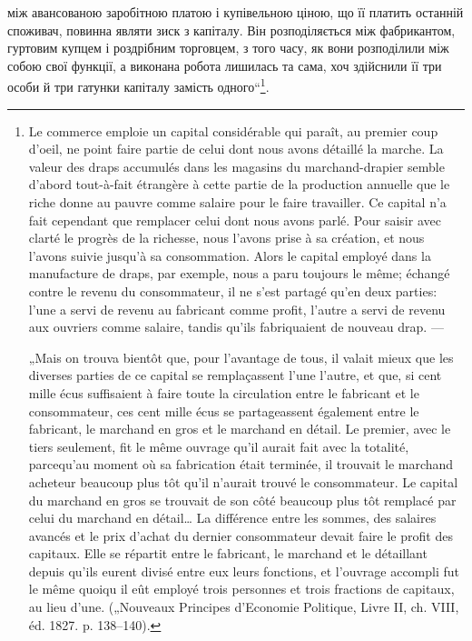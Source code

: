 \parcont{}  %
між авансованою заробітною платою і купівельною ціною, що її платить
останній споживач, повинна являти зиск з капіталу. Він розподіляється
між фабрикантом, гуртовим купцем і роздрібним торговцем, з того часу,
як вони розподілили між собою свої функції, а виконана робота лишилась
та сама, хоч здійснили її три особи й три гатунки капіталу
замість одного“\footnote*{
Le commerce emploie un capital considérable qui paraît, au premier coup
d’oeil, ne point faire partie de celui dont nous avons détaillé la marche. La valeur
des draps accumulés dans les magasins du marchand-drapier semble d'abord tout-à-fait étrangère à
cette partie de la production annuelle que le riche donne au
pauvre comme salaire pour le faire travailler. Ce capital n’a fait cependant que
remplacer celui dont nous avons parlé. Pour saisir avec clarté le progrès de la
richesse, nous l’avons prise à sa création, et nous l’avons suivie jusqu’à sa consommation.
Alors le capital employé dans la manufacture de draps, par exemple, nous a paru
toujours le même; échangé contre le revenu du consommateur, il ne s’est partagé
qu’en deux parties: l’une a servi de revenu au fabricant comme profit, l’autre a servi de revenu aux
ouvriers comme salaire, tandis qu’ils fabriquaient de nouveau drap. —

„Mais on trouva bientôt que, pour l’avantage de tous, il valait mieux que les
diverses parties de ce capital se remplaçassent l’une l’autre, et que, si cent mille
écus suffisaient à faire toute la circulation entre le fabricant et le consommateur,
ces cent mille écus se partageassent également entre le fabricant, le marchand en
gros et le marchand en détail. Le premier, avec le tiers seulement, fit le même
ouvrage qu’il aurait fait avec la totalité, parcequ’au moment où sa fabrication était
terminée, il trouvait le marchand acheteur beaucoup plus tôt qu’il n’aurait trouvé le consommateur.
Le capital du marchand en gros se trouvait de son côté beaucoup
plus tôt remplacé par celui du marchand en détail\dots{} La différence entre les sommes, des salaires
avancés et le prix d’achat du dernier consommateur devait faire le profit des capitaux. Elle se
répartit entre le fabricant, le marchand et le détaillant depuis qu’ils eurent divisé entre eux
leurs fonctions, et l’ouvrage accompli fut le même quoiqu il eût employé trois personnes et trois
fractions de capitaux, au lieu d’une.
(„Nouveaux Principes d’Economie Politique, Livre II, ch. VIII, éd. 1827. p. 138--140).
}.

